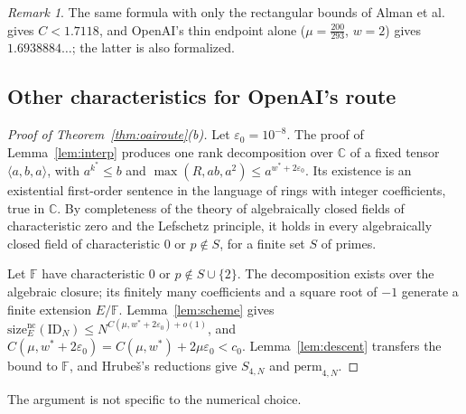 \documentclass[11pt]{article}
\theoremstyle{definition}
\theoremstyle{remark}
\newtheorem{remark}[theorem]{Remark}
\newcommand{\F}{\mathbb{F}}
\newcommand{\C}{\mathbb{C}}
\newcommand{\ID}{\mathrm{ID}}
\newcommand{\size}{\mathrm{size}^{\mathrm{nc}}}
\begin{document}
\begin{remark}
The same formula with only the rectangular bounds of Alman et al.~\cite{ADVWXXZ2024} gives $C<1.7118$, and
OpenAI's thin endpoint alone ($\mu=\frac{200}{293}$, $w=2$) gives $1.6938884\ldots$; the latter is also formalized.
\end{remark}

\subsection{Other characteristics for OpenAI's route}\label{sec:charp}

\begin{proof}[Proof of Theorem~\ref{thm:oairoute}(b)]
Let $\varepsilon_0=10^{-8}$. The proof of Lemma~\ref{lem:interp} produces one rank decomposition over $\C$ of a
fixed tensor $\langle a,b,a\rangle$, with $a^{k^\ast}\le b$ and $\max(R,ab,a^2)\le a^{w^\ast+2\varepsilon_0}$.
Its existence is an existential first-order sentence in the language of rings with integer coefficients, true in
$\C$. By completeness of the theory of algebraically closed fields of characteristic zero and the Lefschetz
principle, it holds in every algebraically closed field of characteristic $0$ or $p\notin S$, for a finite set $S$
of primes.

Let $\F$ have characteristic $0$ or $p\notin S\cup\{2\}$. The decomposition exists over the algebraic closure; its
finitely many coefficients and a square root of $-1$ generate a finite extension $E/\F$. Lemma~\ref{lem:scheme}
gives $\size_E(\ID_N)\le N^{C(\mu,w^\ast+2\varepsilon_0)+o(1)}$, and
$C(\mu,w^\ast+2\varepsilon_0)=C(\mu,w^\ast)+2\mu\varepsilon_0<c_0$. Lemma~\ref{lem:descent} transfers the bound to
$\F$, and Hrube\v{s}'s reductions give $S_{4,N}$ and $\mathrm{perm}_{4,N}$.
\end{proof}

The argument is not specific to the numerical choice.
\end{document}
